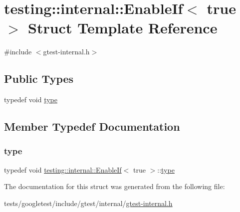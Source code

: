 \hypertarget{structtesting_1_1internal_1_1EnableIf_3_01true_01_4}{}\section{testing\+:\+:internal\+:\+:Enable\+If$<$ true $>$ Struct Template Reference}
\label{structtesting_1_1internal_1_1EnableIf_3_01true_01_4}


{\ttfamily \#include $<$gtest-\/internal.\+h$>$}

\subsection*{Public Types}
\begin{DoxyCompactItemize}
\item 
typedef void \hyperlink{structtesting_1_1internal_1_1EnableIf_3_01true_01_4_a9398d803f1fdd99ff41823746f6299ff}{type}
\end{DoxyCompactItemize}


\subsection{Member Typedef Documentation}
\mbox{\label{structtesting_1_1internal_1_1EnableIf_3_01true_01_4_a9398d803f1fdd99ff41823746f6299ff}} 
\subsubsection{\texorpdfstring{type}{type}}
{\footnotesize\ttfamily typedef void \hyperlink{structtesting_1_1internal_1_1EnableIf}{testing\+::internal\+::\+Enable\+If}$<$ true $>$\+::\hyperlink{structtesting_1_1internal_1_1EnableIf_3_01true_01_4_a9398d803f1fdd99ff41823746f6299ff}{type}}



The documentation for this struct was generated from the following file\+:\begin{DoxyCompactItemize}
\item 
tests/googletest/include/gtest/internal/\hyperlink{gtest-internal_8h}{gtest-\/internal.\+h}\end{DoxyCompactItemize}
